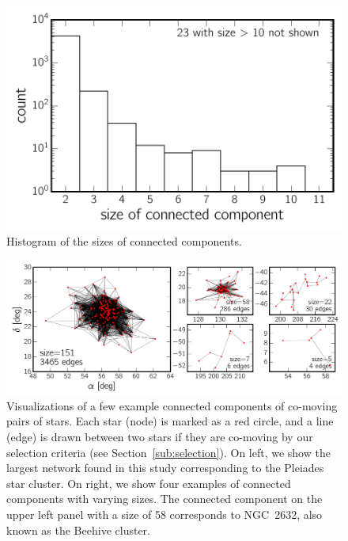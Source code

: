 \documentclass[manuscript, letterpaper]{aastex6}
\newcommand{\sectionname}{Section}
\begin{document}
\begin{figure}[htbp]
  \begin{center}
    \includegraphics[width=\textwidth]{figures/dist_networksize.pdf}
  \end{center}
  \caption{%
    Histogram of the sizes of connected components.
    \label{fig:hist_ccsize}}
\end{figure}

\begin{figure}[htbp]
  \begin{center}
    \includegraphics[width=\textwidth]{figures/graphviz_examples.pdf}
  \end{center}
  \caption{%
    Visualizations of a few example connected components of co-moving pairs of stars.
    Each star (node) is marked as a red circle, and a line (edge) is drawn
    between two stars if they are co-moving by our selection criteria
    (see \sectionname~\ref{sub:selection}). On left, we show the largest network
    found in this study corresponding to the Pleiades star cluster.
    On right, we show four examples of connected components with varying sizes.
    The connected component on the upper left panel with a size of 58 corresponds
    to NGC~2632, also known as the Beehive cluster.
    \label{fig:graphviz_examples}}
\end{figure}
\end{document}
